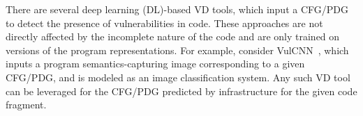 \vspace{3pt}
 There are several deep learning (DL)-based VD tools, which input a CFG/PDG to detect the presence of vulnerabilities in code. These approaches are not directly affected by the incomplete nature of the code and are only trained on versions of the program representations. For example, consider VulCNN~\cite{wu2022vulcnn}, which inputs a program semantics-capturing image corresponding to a given CFG/PDG, and is modeled as an image classification system. Any such VD tool can be leveraged for the CFG/PDG predicted by \tool infrastructure for the given code fragment. 
